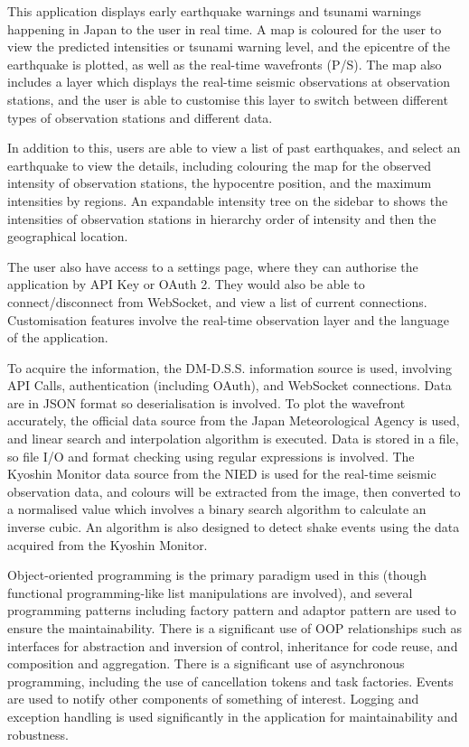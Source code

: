 This application displays early earthquake warnings and tsunami warnings happening in Japan to the user in real time. A map is coloured for the user to view the predicted intensities or tsunami warning level, and the epicentre of the earthquake is plotted, as well as the real-time wavefronts (P/S). The map also includes a layer which displays the real-time seismic observations at observation stations, and the user is able to customise this layer to switch between different types of observation stations and different data.

In addition to this, users are able to view a list of past earthquakes, and select an earthquake to view the details, including colouring the map for the observed intensity of observation stations, the hypocentre position, and the maximum intensities by regions. An expandable intensity tree on the sidebar to shows the intensities of observation stations in hierarchy order of intensity and then the geographical location.

The user also have access to a settings page, where they can authorise the application by API Key or OAuth 2. They would also be able to connect/disconnect from WebSocket, and view a list of current connections. Customisation features involve the real-time observation layer and the language of the application.

To acquire the information, the DM-D.S.S. information source is used, involving API Calls, authentication (including OAuth), and WebSocket connections. Data are in JSON format so deserialisation is involved. To plot the wavefront accurately, the official data source from the Japan Meteorological Agency is used, and linear search and interpolation algorithm is executed. Data is stored in a file, so file I/O and format checking using regular expressions is involved. The Kyoshin Monitor data source from the NIED is used for the real-time seismic observation data, and colours will be extracted from the image, then converted to a normalised value which involves a binary search algorithm to calculate an inverse cubic. An algorithm is also designed to detect shake events using the data acquired from the Kyoshin Monitor.

Object-oriented programming is the primary paradigm used in this (though functional programming-like list manipulations are involved), and several programming patterns including factory pattern and adaptor pattern are used to ensure the maintainability. There is a significant use of OOP relationships such as interfaces for abstraction and inversion of control, inheritance for code reuse, and composition and aggregation. There is a significant use of asynchronous programming, including the use of cancellation tokens and task factories. Events are used to notify other components of something of interest. Logging and exception handling is used significantly in the application for maintainability and robustness.

